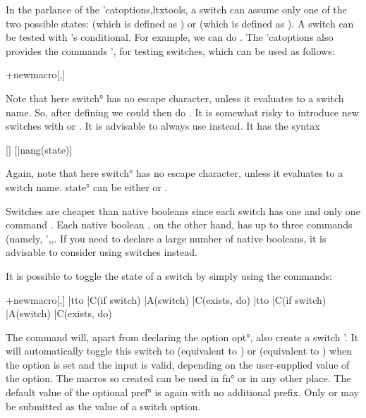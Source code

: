 \documentclass[
  use-a4-paper,
  use-10pt-font,
  final-version,
  use-UK-English,
  fancy-section-headings,
  frame-section-numbers,
  para-abstract-style,
  input-config-file,
  no-hyperref-messages
]{amltxdoc}
\begin{document}
In the parlance of the \pkg'{catoptions,ltxtools}, a switch can assume only one of the two possible states: \fx{\cpttrue} (which is defined as ) or \fx{\cptfalse} (which is defined as ). A switch \fx{\swa} can be tested with \tex's \hx{\if} conditional. For example, we can do \hx{\if}\unskip{}\hx{\fi}. The \pkg'{catoptions} also provides the commands \ffx'{\ifswitchTF,\ifswitchFT} for testing switches, which can be used as follows:

\start+{newmacro}[\ifswitchTF,\ifswitchFT]
\fxim*{\ifswitchTF,\ifswitchFT}

Note that here \ang{switch} has no escape character, unless it evaluates to a switch name. So, after defining  we could then do . It is somewhat risky to introduce new switches with \hx{\def} or \hx{\let}. It is advisable to always use \fx{\newswitch} instead. It has the syntax

[\newswitch]
[|nang(state)]
\fxim*{\newswitch}

Again, note that here \ang{switch} has no escape character, unless it evaluates to a switch name. \ang{state} can be either  or .

Switches are cheaper than native booleans since each switch  has one and only one command \fx{\swa}. Each native boolean , on the other hand, has up to three commands (namely, \ffx'{\ifboola,\boolatrue,\boolafalse}. If you need to declare a large number of native booleans, it is advisable to consider using switches instead.

It is possible to toggle the state of a switch by simply using the commands:

\start+{newmacro}[\setswitchtrue,\setswitchfalse]
  |tto   |C(if switch) |A(switch) |C(exists, do) \let\switch\cpttrue
{}
  |tto   |C(if switch) |A(switch) |C(exists, do) \let\switch\cptfalse
{}
\fxim*{\setswitchtrue,\setswitchfalse}

The command \fx{\XDeclareSwitchOption} will, apart from declaring the option \ang{opt}, also create a switch \fnl*'. It will automatically toggle this switch to  (equivalent to ) or  (equivalent to ) when the option is set and the input is valid, depending on the user-supplied value of the option. The macros so created can be used in \ang{fn} or in any other place. The default value of the optional \ang{pref} is again  with no additional prefix. Only  or  may be submitted as the value of a switch option.
\end{document}
